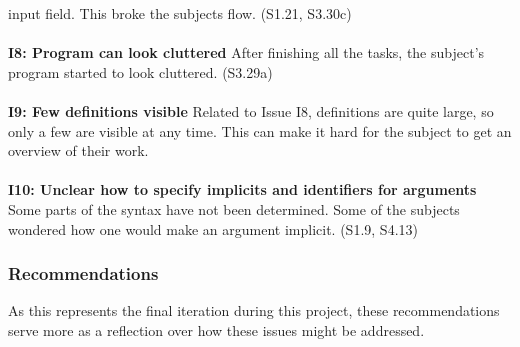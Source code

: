 input field. This broke the subjects flow. (S1.21, S3.30c)
\\ \\
\textbf{I8: Program can look cluttered}
After finishing all the tasks, the subject's program started to look cluttered.
 (S3.29a)
\\ \\
\textbf{I9: Few definitions visible}
Related to Issue I8, definitions are quite large, so only a few are visible at
any time. This can make it hard for the subject to get an overview of their
work.
\\ \\
\textbf{I10: Unclear how to specify implicits and identifiers for arguments}
Some parts of the syntax have not been determined. Some of the subjects
wondered how one would make an argument implicit. (S1.9, S4.13)

\subsubsection{Recommendations}
\label{sec:second_recommendations}
As this represents the final iteration during this project, these
recommendations serve more as a reflection over how these issues might be
addressed.

